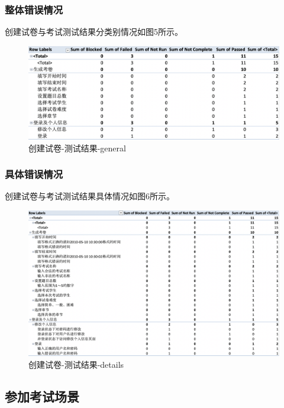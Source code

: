 \documentclass[hyperref, a4paper]{ctexart}
\begin{document}
\hypertarget{ux6574ux4f53ux9519ux8befux60c5ux51b5-1}{%
\subsubsection{整体错误情况}\label{ux6574ux4f53ux9519ux8befux60c5ux51b5-1}}

创建试卷与考试测试结果分类别情况如图5所示。

\begin{figure}
\centering
\includegraphics{screenshoots/PivotTable_general_2.png}
\caption{创建试卷-测试结果-general}
\end{figure}

\hypertarget{ux5177ux4f53ux9519ux8befux60c5ux51b5-1}{%
\subsubsection{具体错误情况}\label{ux5177ux4f53ux9519ux8befux60c5ux51b5-1}}

创建试卷与考试测试结果具体情况如图6所示。

\begin{figure}
\centering
\includegraphics{screenshoots/PivotTable_Details_2.png}
\caption{创建试卷-测试结果-details}
\end{figure}

\hypertarget{ux53c2ux52a0ux8003ux8bd5ux573aux666f-1}{%
\subsection{参加考试场景}\label{ux53c2ux52a0ux8003ux8bd5ux573aux666f-1}}
\end{document}
